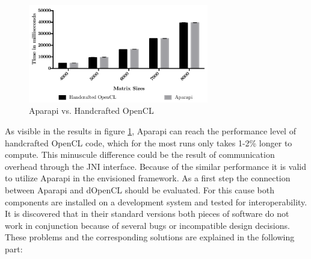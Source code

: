 \begin{figure}[H]
	\includegraphics[width=0.7\textwidth]{images/aparapivsopencl.pdf}
	\centering
	\caption{Aparapi vs. Handcrafted OpenCL}
	\label{img:aparapi_vs_opencl}
\end{figure}

As visible in the results in figure \ref{img:aparapi_vs_opencl}, Aparapi can reach the performance level of handcrafted OpenCL code, which for the most runs only takes 1-2\% longer to compute. This minuscule difference could be the result of communication overhead through the JNI interface. Because of the similar performance it is valid to utilize Aparapi in the envisioned framework. As a first step the connection between Aparapi and dOpenCL should be evaluated. For this cause both components are installed on a development system and tested for interoperability. It is discovered that in their standard versions both pieces of software do not work in conjunction because of several bugs or incompatible design decisions. These problems and the corresponding solutions are explained in the following part:

